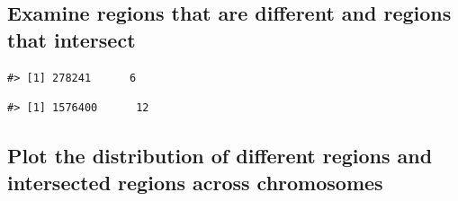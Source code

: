 \subsection{Examine regions that are different and regions that
intersect}\label{examine-regions-that-are-different-and-regions-that-intersect}

\begin{Shaded}
\begin{Highlighting}[]
\NormalTok{)}
\end{Highlighting}
\end{Shaded}

\begin{verbatim}
#> [1] 278241      6
\end{verbatim}

\begin{Shaded}
\begin{Highlighting}[]
\NormalTok{(}\NormalTok{,}\NormalTok{))}
\end{Highlighting}
\end{Shaded}

\begin{verbatim}
#> [1] 1576400      12
\end{verbatim}

\subsection{Plot the distribution of different regions and intersected
regions across
chromosomes}\label{plot-the-distribution-of-different-regions-and-intersected-regions-across-chromosomes}

\begin{Shaded}
\begin{Highlighting}[]
\NormalTok{(}\NormalTok{(}\NormalTok{(}\NormalTok{, }\NormalTok{(}\NormalTok{))+}\NormalTok{(} \NormalTok{)+}\NormalTok{()+}\NormalTok{(}\NormalTok{)+}\NormalTok{(} \NormalTok{(} \NormalTok{, } \NormalTok{))}
\end{Highlighting}
\end{Shaded}

